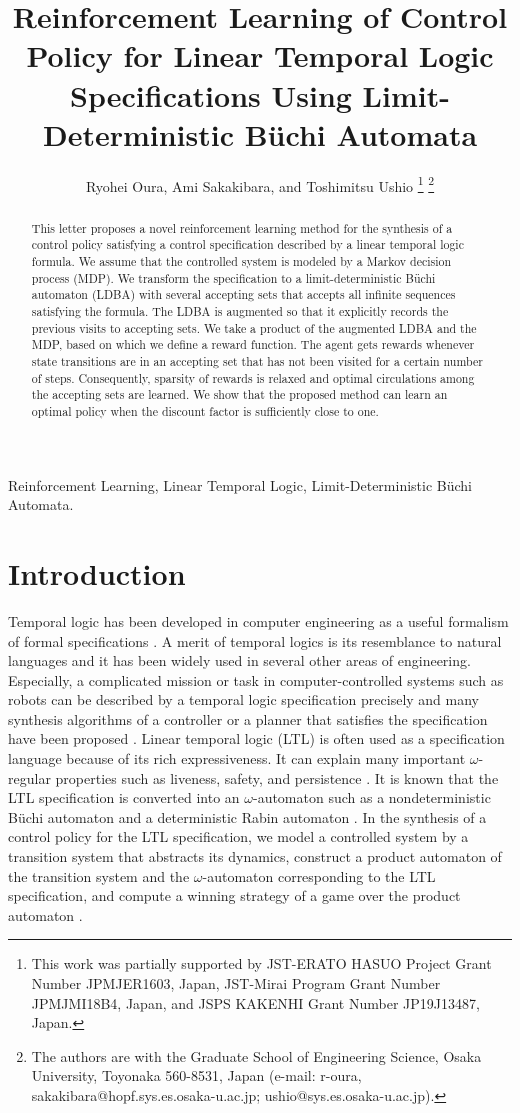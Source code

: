 \documentclass[letterpaper, 10 pt, conference]{ieeeconf}  %
\title{\LARGE \bf
Reinforcement Learning of Control Policy for Linear Temporal Logic Specifications Using Limit-Deterministic B\"{u}chi Automata
}
\author{Ryohei Oura, Ami Sakakibara, and Toshimitsu Ushio%
\thanks{This work was partially supported by JST-ERATO HASUO Project Grant Number JPMJER1603, Japan, JST-Mirai Program Grant Number JPMJMI18B4, Japan, and JSPS KAKENHI Grant Number JP19J13487, Japan.}%
\thanks{The authors are with the Graduate School of Engineering Science, Osaka University, Toyonaka 560-8531, Japan (e-mail: {r-oura, sakakibara}@hopf.sys.es.osaka-u.ac.jp; ushio@sys.es.osaka-u.ac.jp).}%
}
\begin{document}
\maketitle
\thispagestyle{empty}
\pagestyle{empty}

\begin{abstract}

This letter proposes a novel reinforcement learning method for the synthesis of a control policy satisfying a control specification described by a linear temporal logic formula.  We assume that the controlled system is modeled by a Markov decision process (MDP).
We transform the specification to a limit-deterministic B\"{u}chi automaton (LDBA) with several accepting sets that accepts all infinite sequences satisfying the formula.
The LDBA is augmented so that it explicitly records the previous visits to accepting sets.
We take a product of the augmented LDBA and the MDP, based on which we define a reward function.  The agent gets rewards whenever state transitions are in an accepting set that has not been visited for a certain number of steps.
Consequently, sparsity of rewards is relaxed and optimal circulations among the accepting sets are learned. We show that the proposed method can learn an optimal policy when the discount factor is sufficiently close to one.
\end{abstract}

\begin{keywords}
  Reinforcement Learning, Linear Temporal Logic, Limit-Deterministic B\"{u}chi Automata.
\end{keywords}

\section{Introduction}
Temporal logic has been developed in computer engineering as a useful formalism of formal specifications  \cite{BK2008,Clarke2018}.
A merit of temporal logics is its resemblance to natural languages and it has been widely used in several other areas of engineering. Especially, a complicated mission or task in computer-controlled systems such as robots can be described by a temporal logic specification precisely and many synthesis algorithms of a controller or a planner that satisfies the specification have been proposed \cite{KB2008,Gazit2009,WTM2012a,SU2018}.
Linear temporal logic (LTL) is often used as a specification language because of its rich expressiveness.  It can explain many important $\omega$-regular properties such as liveness, safety, and persistence \cite{BK2008}.
It is known that the LTL specification is converted into an $\omega$-automaton such as a nondeterministic B\"{u}chi automaton and a deterministic Rabin automaton \cite{BK2008,Belta2017}.
In the synthesis of a control policy for the LTL specification,  we model a controlled system by a transition system that abstracts its dynamics, construct a product automaton of the transition system and the $\omega$-automaton corresponding to the LTL specification, and compute a winning strategy of a game over the product automaton \cite{Belta2017}.
\end{document}
